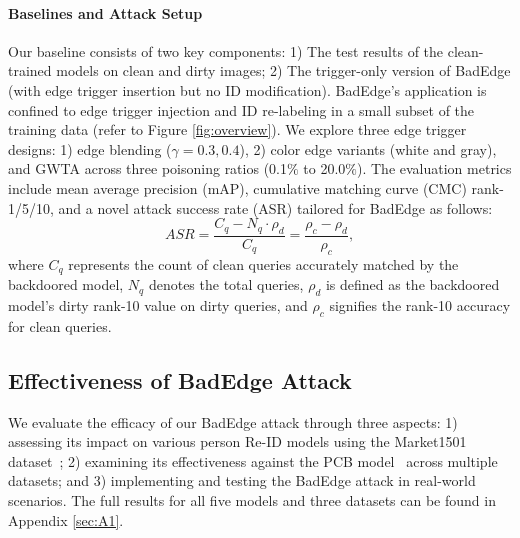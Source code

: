 \documentclass[sigconf,authordraft]{acmart}
\begin{document}
\paragraph{Baselines and Attack Setup}
Our baseline consists of two key components: 1) The test results of the clean-trained models on clean and dirty images; 2) The trigger-only version of BadEdge (with edge trigger insertion but no ID modification).
BadEdge's application is confined to edge trigger injection and ID re-labeling in a small subset of the training data (refer to Figure \ref{fig:overview}).
We explore three edge trigger designs: 1) edge blending ($\gamma=0.3, 0.4$), 2) color edge variants (white and gray), and GWTA across three poisoning ratios (0.1$\%$ to 20.0$\%$).
The evaluation metrics include mean average precision (mAP), cumulative matching curve (CMC) rank-1/5/10, and a novel attack success rate (ASR) tailored for BadEdge as follows:
\begin{equation}
ASR=\frac{C_q-N_q \cdot \rho_d}{C_q}=\frac{\rho_c - \rho_d}{\rho_c},
    \label{eq:asr}
\end{equation}
where $C_q$ represents the count of clean queries accurately matched by the backdoored model, $N_q$ denotes the total queries, $\rho_d$ is defined as the backdoored model's dirty rank-10 value on dirty queries, and $\rho_c$ signifies the rank-10 accuracy for clean queries.



\subsection{Effectiveness of BadEdge Attack}
We evaluate the efficacy of our BadEdge attack through three aspects: 1) assessing its impact on various person Re-ID models using the Market1501 dataset~\cite{zhang2017alignedreid}; 2) 
examining its effectiveness against the PCB model~\cite{sun2018beyond} across multiple datasets; and 3) implementing and testing the BadEdge attack in real-world scenarios. The full results for all five models and three datasets can be found in Appendix \ref{sec:A1}.
\end{document}
